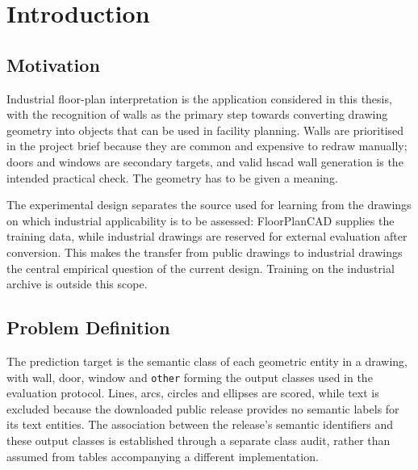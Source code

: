 \chapter{Introduction}
\label{ch:introduction}

\section{Motivation}
\label{sec:motivation}
Industrial floor-plan interpretation is the application considered in this thesis,
with the recognition of walls as the primary step towards converting drawing
geometry into objects that can be used in facility planning.
Walls are prioritised in the project brief because they are common and expensive
to redraw manually; doors and windows are secondary targets, and valid
\gls{hscad} wall generation is the intended practical check.
The geometry has to be given a meaning.

The experimental design separates the source used for learning from the drawings
on which industrial applicability is to be assessed: FloorPlanCAD supplies the
training data, while industrial drawings are reserved for external evaluation
after conversion.
This makes the transfer from public drawings to industrial drawings the central
empirical question of the current design.
Training on the industrial archive is outside this scope.

\section{Problem Definition}
\label{sec:problem-definition}
The prediction target is the semantic class of each geometric entity in a drawing,
with wall, door, window and \texttt{other} forming the output classes used in the
evaluation protocol.
Lines, arcs, circles and ellipses are scored, while text is excluded because the
downloaded public release provides no semantic labels for its text entities.
The association between the release's semantic identifiers and these output
classes is established through a separate class audit, rather than assumed from
tables accompanying a different implementation.

